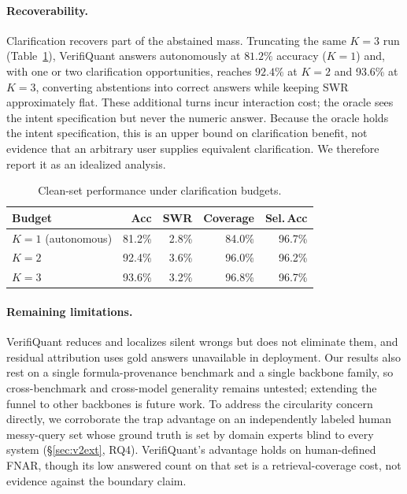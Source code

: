 \documentclass[sigconf,anonymous]{acmart}
\newcommand{\vqAccAll}{93.6\%}
\newcommand{\vqCovAll}{96.8\%}
\newcommand{\vqSelAccAll}{96.7\%}
\newcommand{\vqSWRAll}{3.2\%}
\begin{document}
\paragraph{Recoverability.}
Clarification recovers part of the abstained mass.
Truncating the same $K{=}3$ run (Table~\ref{tab:v2kabl}), VerifiQuant answers autonomously at $81.2\%$ accuracy ($K{=}1$) and, with one or two clarification opportunities, reaches $92.4\%$ at $K{=}2$ and \vqAccAll{} at $K{=}3$, converting abstentions into correct answers while keeping SWR approximately flat. These additional turns incur interaction cost; the oracle sees the intent specification but never the numeric answer. Because the oracle holds the intent specification, this is an upper bound on clarification benefit, not evidence that an arbitrary user supplies equivalent clarification. We therefore report it as an idealized analysis.


\begin{table}[t]
\caption{Clean-set performance under clarification budgets.}
\label{tab:v2kabl}
\small
\begin{tabular}{@{}lrrrr@{}}
\toprule
Budget & Acc & SWR & Coverage & Sel.\,Acc \\
\midrule
$K{=}1$ (autonomous) & 81.2\% & 2.8\% & 84.0\% & 96.7\% \\
$K{=}2$ & 92.4\% & 3.6\% & 96.0\% & 96.2\% \\
$K{=}3$ & \vqAccAll{} & \vqSWRAll{} & \vqCovAll{} & \vqSelAccAll{} \\
\bottomrule
\end{tabular}
\end{table}


\paragraph{Remaining limitations.}
VerifiQuant reduces and localizes silent wrongs but does not eliminate them, and residual attribution uses gold answers unavailable in deployment.
Our results also rest on a single formula-provenance benchmark and a single backbone family, so cross-benchmark and cross-model generality remains untested; extending the funnel to other backbones is future work.
To address the circularity concern directly, we corroborate the trap advantage on an independently labeled human messy-query set whose ground truth is set by domain experts blind to every system (\S\ref{sec:v2ext}, RQ4). VerifiQuant's advantage holds on human-defined FNAR, though its low answered count on that set is a retrieval-coverage cost, not evidence against the boundary claim.
\end{document}
